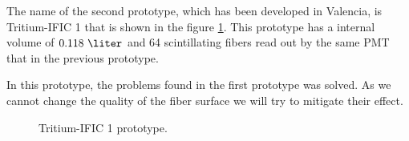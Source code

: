 The name of the second prototype, which has been developed in Valencia, is Tritium-IFIC 1 that is shown in the figure \ref{fig:Tritium_IFIC_1}. This prototype has a internal volume of $0.118~\liter$ and 64 scintillating fibers read out by the same PMT that in the previous prototype. 

In this prototype, the problems found in the first prototype was solved. As we cannot change the quality of the fiber surface we will try to mitigate their effect.

\begin{figure}[htbp]
\centering
{}\hspace{10mm}
\hspace{10mm}
\caption{Tritium-IFIC 1 prototype.} \label{fig:Tritium_IFIC_1}
\end{figure}

